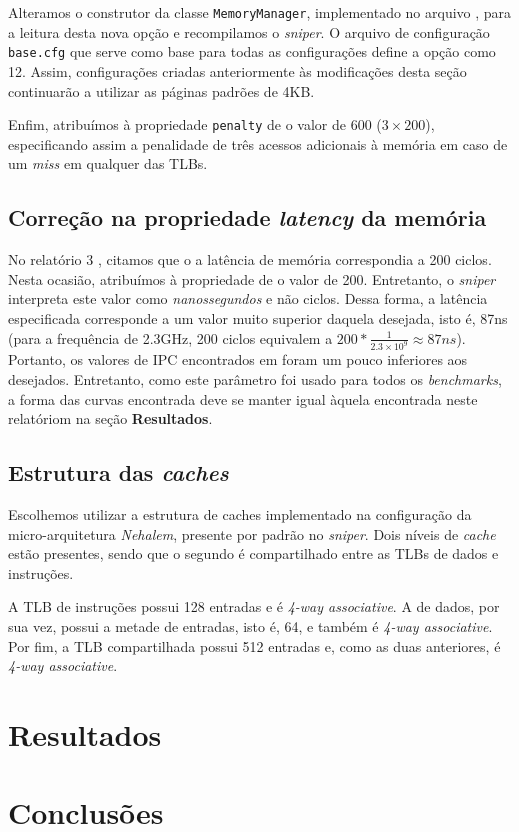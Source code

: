 \documentclass[12pt]{article}
\begin{document}
Alteramos o construtor da classe \texttt{MemoryManager}, implementado
no arquivo , para a leitura desta nova opção e
recompilamos o \textit{sniper}. O arquivo de configuração \texttt{base.cfg} que
serve como base para todas as configurações define a opção 
como 12. Assim, configurações criadas anteriormente às modificações desta
seção continuarão a utilizar as páginas padrões de 4KB.

Enfim, atribuímos à propriedade \texttt{penalty} de  o
valor de 600 (\(3\times 200\)), especificando assim a penalidade de três acessos
adicionais à memória em caso de um \textit{miss} em qualquer das TLBs.

\subsection{Correção na propriedade \textit{latency} da memória}

No relatório 3 \cite{relatorio3}, citamos que o a latência de memória
correspondia a 200 ciclos. Nesta ocasião, atribuímos à propriedade
 de  o valor de 200. Entretanto, o
\textit{sniper} interpreta este valor como \textit{nanossegundos} e não ciclos.
Dessa forma, a latência especificada corresponde a um valor muito superior
daquela desejada, isto é, 87ns (para a frequência de 2.3GHz, 200 ciclos
equivalem a \(200*\frac{1}{2.3\times 10^9} \approx 87ns\)). Portanto, os valores
de IPC encontrados em \cite{relatorio3} foram um pouco inferiores aos desejados.
Entretanto, como este parâmetro foi usado para todos os \textit{benchmarks}, a
forma das curvas encontrada deve se manter igual àquela encontrada neste
relatóriom na seção \textbf{Resultados}.

\subsection{Estrutura das \textit{caches}}

Escolhemos utilizar a estrutura de caches implementado na configuração da
micro-arquitetura \textit{Nehalem}, presente por padrão no \textit{sniper}. Dois
níveis de \textit{cache} estão presentes, sendo que o segundo é compartilhado
entre as TLBs de dados e instruções. 

A TLB de instruções possui 128 entradas e é \textit{4-way associative}. A de
dados, por sua vez, possui a metade de entradas, isto é, 64, e também é
\textit{4-way associative}. Por fim, a TLB compartilhada possui 512 entradas e,
como as duas anteriores, é \textit{4-way associative}. 

\section{Resultados}

\section{Conclusões}




\end{document}
